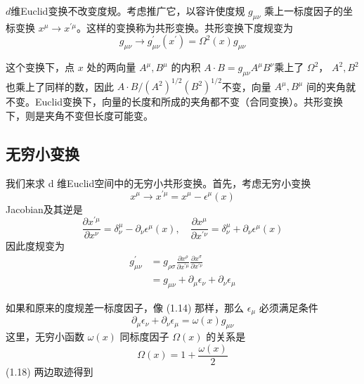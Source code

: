 $d $维Euclid变换不改变度规。考虑推广它，以容许使度规 $g_{\mu\nu}$ 乘上一标度因子的坐标变换 $x^{\mu} \rightarrow x^{\prime \mu} $。这样的变换称为共形变换。共形变换下度规变为
\begin{equation}
	g_{\mu \nu} \rightarrow g_{\mu \nu}^{\prime}\left(x^{\prime}\right)=\Omega^{2}(x) g_{\mu \nu}
\end{equation}


这个变换下，点 $x$ 处的两向量 $A^\mu,B^\mu$ 的内积 $A \cdot B=g_{\mu \nu} A^{\mu} B^{\nu} $乘上了 $\Omega^2 $， $A^2,B^2$ 也乘上了同样的数，因此 $A \cdot B /\left(A^{2}\right)^{1 / 2}\left(B^{2}\right)^{1 / 2} $不变，向量 $A^\mu,B^\mu$ 间的夹角就不变。Euclid变换下，向量的长度和所成的夹角都不变（合同变换）。共形变换下，则是夹角不变但长度可能变。

\subsection{无穷小变换}

我们来求 d 维Euclid空间中的无穷小共形变换。首先，考虑无穷小变换
\begin{equation}
	x^{\mu} \rightarrow x^{\prime \mu}=x^{\mu}-\epsilon^{\mu}(x)
\end{equation}
Jacobian及其逆是
\begin{equation}
	\frac{\partial x^{\prime \mu}}{\partial x^{\nu}}=\delta_{\nu}^{\mu}-\partial_{\nu} \epsilon^{\mu}(x), \quad \frac{\partial x^{\mu}}{\partial x^{\prime \nu}}=\delta_{\nu}^{\mu}+\partial_{\nu} \epsilon^{\mu}(x)
\end{equation}
因此度规变为
\begin{equation}
	\begin{aligned} g_{\mu \nu}^{\prime}&=g_{\rho \sigma} \frac{\partial x^{\rho}}{\partial x^{\prime \mu}} \frac{\partial x^{\sigma}}{\partial x^{\prime \nu}}\\ &=g_{\mu \nu}+\partial_{\mu} \epsilon_{\nu}+\partial_{\nu} \epsilon_{\mu} \end{aligned}
\end{equation}


如果和原来的度规差一标度因子，像 (1.14) 那样，那么 $\epsilon_\mu$ 必须满足条件
\begin{equation}
	\partial_{\mu}\epsilon_{\nu}+\partial_{\nu}\epsilon_{\mu}=\omega(x) g_{\mu \nu}
\end{equation}
这里，无穷小函数 $\omega(x)$ 同标度因子 $\Omega(x)$ 的关系是
\begin{equation}
	\Omega(x)=1+\frac{\omega(x)}{2}
\end{equation}
(1.18) 两边取迹得到

